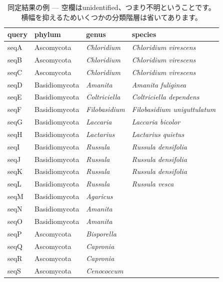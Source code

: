 \documentclass[titlepage,10pt,a4paper,english]{jsbook}
\begin{document}
\begin{table}[h]
\begin{center}
\footnotesize\setlength{\baselineskip}{0.9em}%
\begin{tabular}{l|lll} 
query & phylum & genus & species \\\hline\hline
seqA & Ascomycota & \textit{Chloridium} & \textit{Chloridium virescens} \\
seqB & Ascomycota & \textit{Chloridium} & \textit{Chloridium virescens} \\
seqC & Ascomycota & \textit{Chloridium} & \textit{Chloridium virescens} \\
seqD & Basidiomycota & \textit{Amanita} & \textit{Amanita fuliginea} \\
seqE & Basidiomycota & \textit{Coltriciella} & \textit{Coltriciella dependens} \\
seqF & Basidiomycota & \textit{Filobasidium} & \textit{Filobasidium uniguttulatum} \\
seqG & Basidiomycota & \textit{Laccaria} & \textit{Laccaria bicolor} \\
seqH & Basidiomycota & \textit{Lactarius} & \textit{Lactarius quietus} \\
seqI & Basidiomycota & \textit{Russula} & \textit{Russula densifolia} \\
seqJ & Basidiomycota & \textit{Russula} & \textit{Russula densifolia} \\
seqK & Basidiomycota & \textit{Russula} & \textit{Russula densifolia} \\
seqL & Basidiomycota & \textit{Russula} & \textit{Russula vesca} \\
seqM & Basidiomycota & \textit{Agaricus} &  \\
seqN & Basidiomycota & \textit{Amanita} &  \\
seqO & Basidiomycota & \textit{Amanita} &  \\
seqP & Ascomycota & \textit{Bisporella} &  \\
seqQ & Ascomycota & \textit{Capronia} &  \\
seqR & Ascomycota & \textit{Capronia} &  \\
seqS & Ascomycota & \textit{Cenococcum} &  \\
\end{tabular}
\end{center}
\caption{同定結果の例 --- 空欄はunidentified、つまり不明ということです。
横幅を抑えるためいくつかの分類階層は省いてあります。}
\label{table:exampleresultsofidentification}
\end{table}
\end{document}
